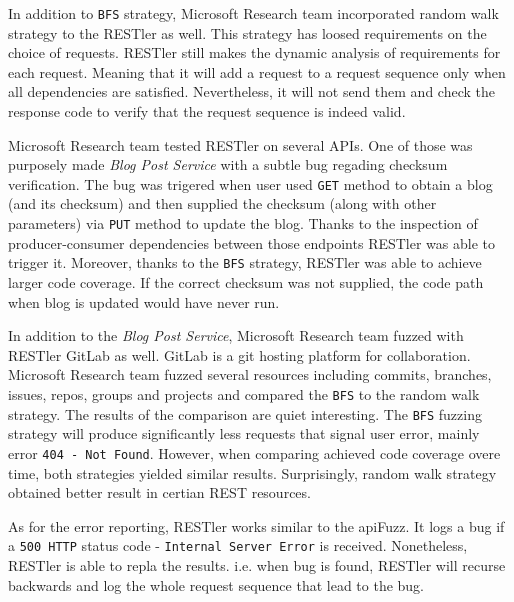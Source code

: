 In addition to \texttt{BFS} strategy, Microsoft Research team incorporated random walk strategy to the RESTler as well. This strategy has loosed requirements on the choice of requests. RESTler still makes the dynamic analysis of requirements for each request. Meaning that it will add a request to a request sequence only when all dependencies are satisfied. Nevertheless, it will not send them and check the response code to verify that the request sequence is indeed valid.

Microsoft Research team tested RESTler on several APIs. One of those was purposely made \textit{Blog Post Service} with a subtle bug regading checksum verification. The bug was trigered when user used \texttt{GET} method to obtain a blog (and its checksum) and then supplied the checksum (along with other parameters) via \texttt{PUT} method to update the blog. Thanks to the inspection of producer-consumer dependencies between those endpoints RESTler was able to trigger it. Moreover, thanks to the \texttt{BFS} strategy, RESTler was able to achieve larger code coverage. If the correct checksum was not supplied, the code path when blog is updated would have never run.

In addition to the \textit{Blog Post Service}, Microsoft Research team fuzzed with RESTler GitLab as well. GitLab is a git hosting platform for collaboration. Microsoft Research team fuzzed several resources including commits, branches, issues, repos, groups and projects and compared the \texttt{BFS} to the random walk strategy. The results of the comparison are quiet interesting. The \texttt{BFS} fuzzing strategy will produce significantly less requests that signal user error, mainly error \texttt{404 - Not Found}. However, when comparing achieved code coverage overe time, both strategies yielded similar results. Surprisingly, random walk strategy obtained better result in certian REST resources.

As for the error reporting, RESTler works similar to the apiFuzz. It logs a bug if a \texttt{500 HTTP} status code - \texttt{Internal Server Error} is received. Nonetheless, RESTler is able to repla the results. i.e. when bug is found, RESTler will recurse backwards and log the whole request sequence that lead to the bug.

